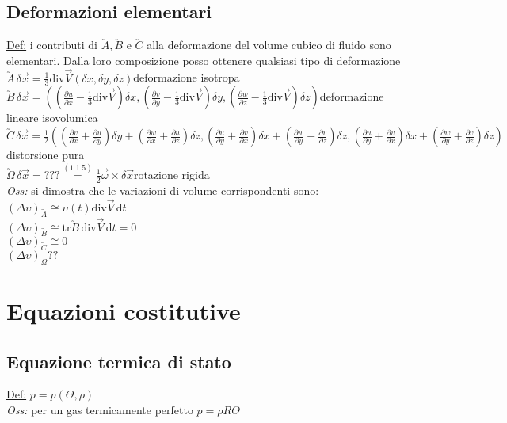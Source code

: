 \documentclass[11pt,a4paper]{report}
\newcommand{\de}{\mathrm d}
\begin{document}
	\subsection{Deformazioni elementari}	\label{def elem}
	\underline{Def:} i contributi di $\utilde A,\utilde B$ e $\utilde C$ alla deformazione del volume cubico di fluido sono elementari. Dalla loro composizione posso ottenere qualsiasi tipo di deformazione\\
	$\utilde A\,\delta\vec x=\frac 13\mathrm{div}\vec V(\delta x,\delta y,\delta z)$\quad deformazione isotropa\\
	$\utilde B\,\delta\vec x=((\frac{\partial u}{\partial x}\!-\!\frac13\mathrm{div}\vec V)\delta x,(\frac{\partial v}{\partial y}\!-\!\frac13\mathrm{div}\vec V)\delta y,(\frac{\partial w}{\partial z}\!-\!\frac13\mathrm{div}\vec V)\delta z)$\quad deformazione lineare isovolumica\\
	$\utilde C\,\delta\vec x=\frac 12((\frac{\partial v}{\partial x}\!+\!\frac{\partial u}{\partial y})\delta y\!+\!(\frac{\partial w}{\partial x}\!+\!\frac{\partial u}{\partial z})\delta z,(\frac{\partial u}{\partial y}\!+\!\frac{\partial v}{\partial x})\delta x\!+\!(\frac{\partial w}{\partial y}\!+\!\frac{\partial v}{\partial z})\delta z,(\frac{\partial u}{\partial y}\!+\!\frac{\partial v}{\partial x})\delta x\!+\!(\frac{\partial w}{\partial y}\!+\!\frac{\partial v}{\partial z})\delta z)$\quad distorsione pura\\
	$\utilde\Omega\,\delta\vec x= ???\overset{(1.1.5)}{=}\frac 12\vec\omega\times\delta\vec x$\quad rotazione rigida\\
	\textit{Oss:} si dimostra che le variazioni di volume corrispondenti sono:\\
	$(\Delta\upsilon)_{\utilde A}\cong\upsilon(t)\mathrm{div}\vec V\,\de t$\\
	$(\Delta\upsilon)_{\utilde B}\cong\mathrm{tr}\utilde B\,\mathrm{div}\vec V\,\de t=0$\\
	$(\Delta\upsilon)_{\utilde C}\cong 0$\\
	$(\Delta\upsilon)_{\utilde \Omega} ??$
	
	\section{Equazioni costitutive}	\label{equaz cost}
		\subsection{Equazione termica di stato}
		\underline{Def:} $p=p(\Theta,\rho)$\\
		\textit{Oss:} per un gas termicamente perfetto $p=\rho R\Theta$
\end{document}
